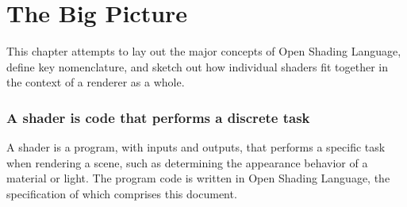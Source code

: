 \documentclass[11pt,letterpaper]{book}
\def\langname{Open Shading Language\xspace}
\begin{document}
\bigskip

%
% 


\chapter{The Big Picture}
\label{chap:shaderstructure}
\label{chap:bigpicture}

This chapter attempts to lay out the major concepts of \langname,
define key nomenclature, and sketch out how individual shaders fit 
together in the context of a renderer as a whole.


\subsection*{A shader is code that performs a discrete task}

A shader is a program, with inputs and outputs, that performs a specific
task when rendering a scene, such as determining the appearance behavior
of a material or light.  The program code is written in \langname, the
specification of which comprises this document.
\end{document}
